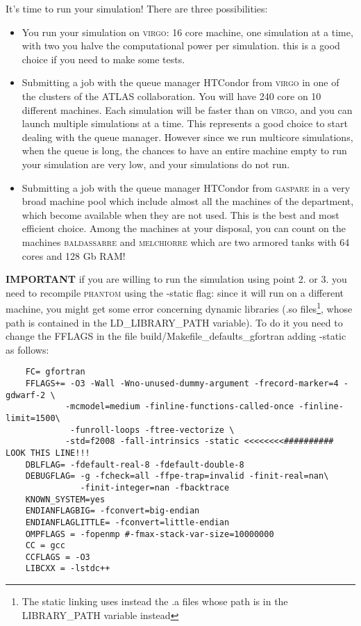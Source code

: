 \documentclass[10pt,a4paper,twoside]{article} %
\begin{document}
It's time to run your simulation! There are three possibilities: 

\begin{itemize}
\item[1.] You run your simulation on \textsc{virgo}: 16 core machine, one simulation at a time, with two you halve the computational power per simulation. this is a good choice if you need to make some tests.

\item[2.] Submitting a job with the queue manager HTCondor from \textsc{virgo} in one of the clusters of the ATLAS collaboration. You will have 240 core on 10 different machines. Each simulation will be faster than on \textsc{virgo}, and you can launch multiple simulations at a time. This represents a good choice to start dealing with the queue manager. However since we run multicore simulations, when the queue is long, the chances to have an entire machine empty to run your simulation are very low, and your simulations do not run.

\item[3.] Submitting a job with the queue manager HTCondor from \textsc{gaspare} in a very broad machine pool which include almost all the machines of the department, which become available when they are not used. This is the best and most efficient choice. Among the machines at your disposal, you can count on the machines \textsc{baldassarre} and \textsc{melchiorre} which are two armored tanks with 64 cores and 128 Gb RAM!
\end{itemize}

\textbf{IMPORTANT} if you are willing to run the simulation using point 2. or 3. you need to recompile \textsc{phantom} using the -static flag: since it will run on a different machine, you might get some error concerning dynamic libraries (.so files\footnote{The static linking uses instead the .a files whose path is in the LIBRARY\_PATH variable instead}, whose path is contained in the LD\_LIBRARY\_PATH variable). To do it you need to change the FFLAGS in the file build/Makefile\_defaults\_gfortran adding -static as follows:

\begin{verbatim}
    FC= gfortran
    FFLAGS+= -O3 -Wall -Wno-unused-dummy-argument -frecord-marker=4 -gdwarf-2 \
            -mcmodel=medium -finline-functions-called-once -finline-limit=1500\
             -funroll-loops -ftree-vectorize \
            -std=f2008 -fall-intrinsics -static <<<<<<<<########## LOOK THIS LINE!!!
    DBLFLAG= -fdefault-real-8 -fdefault-double-8
    DEBUGFLAG= -g -fcheck=all -ffpe-trap=invalid -finit-real=nan\
               -finit-integer=nan -fbacktrace
    KNOWN_SYSTEM=yes
    ENDIANFLAGBIG= -fconvert=big-endian
    ENDIANFLAGLITTLE= -fconvert=little-endian
    OMPFLAGS = -fopenmp #-fmax-stack-var-size=10000000
    CC = gcc
    CCFLAGS = -O3
    LIBCXX = -lstdc++
\end{verbatim}
\end{document}
